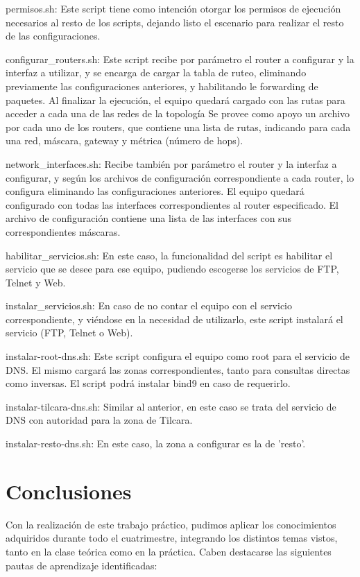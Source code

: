 \documentclass[12pt,titlepage]{article}
\begin{document}
permisos.sh:
Este script tiene como intenci\'on otorgar los permisos de ejecuci\'on necesarios al resto de los scripts, dejando listo el escenario para realizar el resto de las configuraciones.

configurar\_routers.sh:
Este script recibe por par\'ametro el router a configurar y la interfaz a utilizar, y se encarga de cargar la tabla de ruteo, eliminando previamente las configuraciones anteriores, y habilitando le forwarding de paquetes.
Al finalizar la ejecuci\'on, el equipo quedar\'a cargado con las rutas para acceder a cada una de las redes de la topolog\'ia
Se provee como apoyo un archivo por cada uno de los routers, que contiene una lista de rutas, indicando para cada una red, m\'ascara, gateway y m\'etrica (n\'umero de hops).

network\_interfaces.sh:
Recibe tambi\'en por par\'ametro el router y la interfaz a configurar, y seg\'un los archivos de configuraci\'on correspondiente a cada router, lo configura eliminando las configuraciones anteriores.
El equipo quedar\'a configurado con todas las interfaces correspondientes al router especificado.
El archivo de configuraci\'on contiene una lista de las interfaces con sus correspondientes m\'ascaras.

habilitar\_servicios.sh:
En este caso, la funcionalidad del script es habilitar el servicio que se desee para ese equipo, pudiendo escogerse los servicios de FTP, Telnet y Web.

instalar\_servicios.sh:
En caso de no contar el equipo con el servicio correspondiente, y vi\'endose en la necesidad de utilizarlo, este script instalar\'a el servicio (FTP, Telnet o Web).

instalar-root-dns.sh:
Este script configura el equipo como root para el servicio de DNS.
El mismo cargar\'a las zonas correspondientes, tanto para consultas directas como inversas.
El script podr\'a instalar bind9 en caso de requerirlo.

instalar-tilcara-dns.sh:
Similar al anterior, en este caso se trata del servicio de DNS con autoridad para la zona de Tilcara.

instalar-resto-dns.sh:
En este caso, la zona a configurar es la de 'resto'.

\section{Conclusiones}

Con la realizaci\'on de este trabajo pr\'actico, pudimos aplicar los conocimientos adquiridos durante todo el cuatrimestre, integrando los distintos temas vistos, tanto en la clase te\'orica como en la pr\'actica.
Caben destacarse las siguientes pautas de aprendizaje identificadas:
\end{document}

